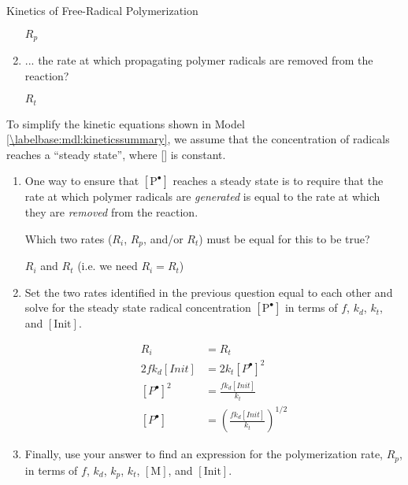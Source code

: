 \begin{activity}{Kinetics of Free-Radical Polymerization}
\begin{ctqs}
\begin{enumerate}
				\begin{solution}[0.4in]{}
					$R_p$
				\end{solution}
				
			\item ... the rate at which propagating polymer radicals are removed from the reaction?
			
				\begin{solution}[0.4in]{}
					$R_t$
				\end{solution}
				
		\end{enumerate}

	\question To simplify the kinetic equations shown in Model \ref{\labelbase:mdl:kineticssummary}, we assume that the concentration of radicals reaches a ``steady state'', where [] is constant.
	
		\begin{enumerate}
			\item One way to ensure that $[\text{P}^{\bullet}]$ reaches a steady state is to require that the rate at which polymer radicals are \emph{generated} is equal to the rate at which they are \emph{removed} from the reaction.
			
				Which two rates ($R_i$, $R_p$, and/or $R_t$) must be equal for this to be true?
				
				\begin{solution}[0.75in]{}
					$R_i$ and $R_t$ (i.e. we need $R_i=R_t$)
				\end{solution}
				
			\item Set the two rates identified in the previous question equal to each other and solve for the steady state radical concentration $[\text{P}^{\bullet}]$ in terms of $f$, $k_d$, $k_t$, and $[\text{Init}]$.
			
				\begin{solution}[2in]{}
					\begin{align*}
						R_i &= R_t \\
						2fk_d[Init] &= 2k_t[P^\bullet]^2\\
						[P^\bullet]^2 &= \frac{fk_d[Init]}{k_t}\\
						[P^\bullet] &= \left(\frac{fk_d[Init]}{k_t}\right)^{1/2}
					\end{align*}
				\end{solution}
			
			\item Finally, use your answer to find an expression for the polymerization rate, $R_p$, in terms of $f$, $k_d$, $k_p$, $k_t$, $[\text{M}]$, and $[\text{Init}]$. \label{\labelbase:ctq:Rp}
			

\end{enumerate}
\end{ctqs}
\end{activity}
